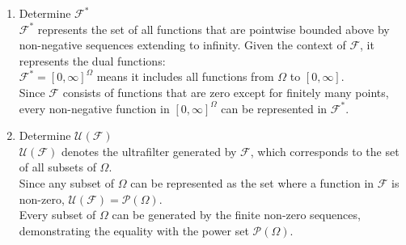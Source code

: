 \documentclass{report}
\begin{document}
{\begin{myproof}
\begin{enumerate}
\begin{itemize}
\item  Pseudocomplement:\\
The pseudocomplement of a function \(f \in \mathcal{F}\) can be considered as a function \(g \in \mathcal{F}\) such that \(f \wedge g = 0\) and \(f \vee g\) is the smallest function with this property.

Thus, \(\mathcal{F}\) satisfies the requirements to be a Stone lattice.
\end{itemize}
\item Determine \(\mathcal{F}^*\)\\

\(\mathcal{F}^*\) represents the set of all functions that are pointwise bounded above by non-negative sequences extending to infinity. Given the context of \(\mathcal{F}\), it represents the dual functions:\\
\(\mathcal{F}^* = [0, \infty]^\Omega\) means it includes all functions from \(\Omega\) to \([0, \infty]\).\\
Since \(\mathcal{F}\) consists of functions that are zero except for finitely many points, every non-negative function in \([0, \infty]^\Omega\) can be represented in \(\mathcal{F}^*\).

\item Determine \(\mathcal{U}(\mathcal{F})\)\\

\(\mathcal{U}(\mathcal{F})\) denotes the ultrafilter generated by \(\mathcal{F}\), which corresponds to the set of all subsets of \(\Omega\).\\
Since any subset of \(\Omega\) can be represented as the set where a function in \(\mathcal{F}\) is non-zero, \(\mathcal{U}(\mathcal{F}) = \mathcal{P}(\Omega)\).\\
Every subset of \(\Omega\) can be generated by the finite non-zero sequences, demonstrating the equality with the power set \(\mathcal{P}(\Omega)\).


\end{enumerate}
\end{myproof}}
\end{document}
